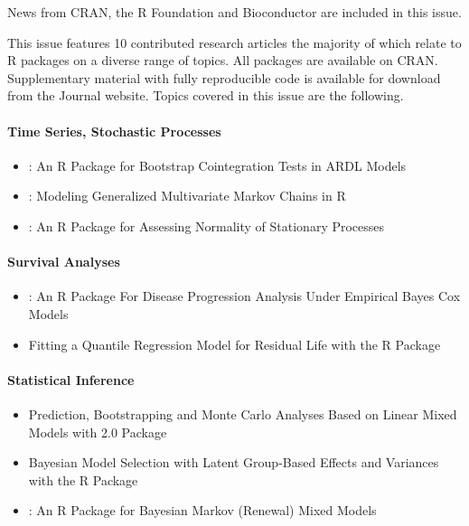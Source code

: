 News from CRAN, the R Foundation and Bioconductor are included in this issue.

\noindent This issue features 10 contributed research articles the majority of
which relate to R packages on a diverse range of topics. All packages are
available on CRAN. Supplementary material with fully reproducible code is
available for download from the Journal website. Topics covered in this issue
are the following.

\paragraph{Time Series, Stochastic Processes}\label{time-series-stochastic-processes}

\begin{itemize}
\tightlist
\item
  : An R Package for Bootstrap Cointegration Tests in ARDL Models
\item
  : Modeling Generalized Multivariate Markov Chains in R
\item
  : An R Package for Assessing Normality of Stationary Processes
\end{itemize}

\paragraph{Survival Analyses}\label{survival-analyses}

\begin{itemize}
\tightlist
\item
  : An R Package For Disease Progression Analysis Under Empirical Bayes Cox Models
\item
  Fitting a Quantile Regression Model for Residual Life with the R Package 
\end{itemize}

\paragraph{Statistical Inference}\label{statistical-inference}

\begin{itemize}
\tightlist
\item
  Prediction, Bootstrapping and Monte Carlo Analyses Based on Linear Mixed Models with  2.0 Package
\item
  Bayesian Model Selection with Latent Group-Based Effects and Variances with the R Package 
\item
  : An R Package for Bayesian Markov (Renewal) Mixed Models
\end{itemize}

